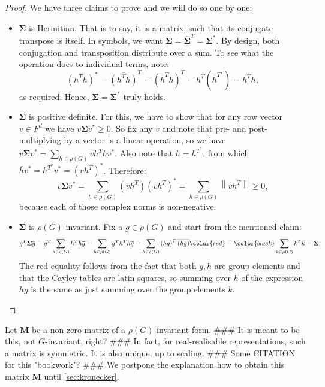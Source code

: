 \documentclass[11pt]{article}
\begin{document}
\begin{proof}
  We have three claims to prove and we will do so one by one:
  \begin{itemize}
    \item $\mathbf{\Sigma}$ is Hermitian. That is to say, it is a matrix, such that its conjugate
    transpose is itself. In symbols, we want $\mathbf{\Sigma} = \overline{\mathbf{\Sigma}}^T = \mathbf{\Sigma}^*$.
    By design, both conjugation and transposition distribute over a sum. To see what the operation
    does to individual terms, note:
    \[\left(h^T\overline{h}\right)^* = \overline{\left(h^T\overline{h}\right)}^T =
    \left(\overline{h}^Th\right)^T = h^T\left(\overline{h}^{T^T}\right) = h^T\overline{h},\]
    as required. Hence, $\mathbf{\Sigma} = \mathbf{\Sigma}^*$ truly holds.
    \item $\mathbf{\Sigma}$ is positive definite. For this, we have to show that for any row vector $v \in F^d$
    we have $v\mathbf{\Sigma}v^* \geq 0$. So fix any $v$ and note that pre- and post-multiplying by
    a vector is a linear operation, so we have $v\mathbf{\Sigma}v^* = \sum_{h \in \rho(G)} vh^T\overline{h}v^*$.
    Also note that $\overline{h} = h^{T^*}$, from which $\overline{h}v^* = h^{T^*}v^* = \left(vh^T\right)^*$. Therefore:
    \[v\mathbf{\Sigma}v^* = \sum_{h \in \rho(G)} \left(vh^T\right)\left(vh^T\right)^* = \sum_{h \in \rho(G)} \left\lVert vh^T\right\rVert \geq 0,\]
    because each of those complex norms is non-negative.
    \item $\mathbf{\Sigma}$ is $\rho(G)$-invariant. Fix a $g \in \rho(G)$ and start from the mentioned claim:
    \[g^T\mathbf{\Sigma}\overline{g} = g^T\sum_{h \in \rho(G)}h^T\overline{h} \overline{g} = \sum_{h \in \rho(G)}g^Th^T\overline{h} \overline{g}=
    \sum_{h \in \rho(G)} \left(hg\right)^T \overline{(hg)} \color{red}=\color{black} \sum_{k \in \rho(G)} k^T \overline{k} = \mathbf{\Sigma}.\]
    The red equality follows from the fact that both $g,h$ are group elements and that the Cayley tables are latin squares, so
    summing over $h$ of the expression $hg$ is the same as just summing over the group elements $k$.
  \end{itemize}
\end{proof}

Let $\mathbf{M}$ be a non-zero matrix of a $\rho(G)$-invariant form. \#\#\# It is meant to be this, not $G$-invariant, right? \#\#\#
In fact, for real-realisable representations, such a matrix is symmetric. It is also unique, up to scaling.
\#\#\# Some CITATION for this "bookwork"? \#\#\#
We postpone the explanation how to obtain this matrix $\mathbf{M}$ until \cref{sec:kronecker}.
\end{document}
